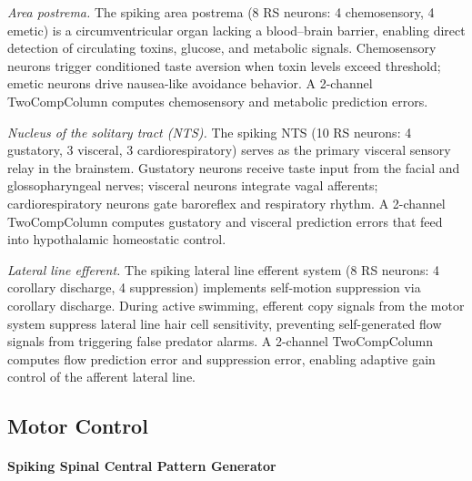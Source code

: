 \documentclass[12pt]{article}
\begin{document}
\emph{Area postrema.}
The spiking area postrema (8 RS neurons: 4 chemosensory, 4 emetic)
is a circumventricular organ lacking a blood--brain barrier, enabling
direct detection of circulating toxins, glucose, and metabolic signals.
Chemosensory neurons trigger conditioned taste aversion when toxin
levels exceed threshold; emetic neurons drive nausea-like avoidance
behavior.
A 2-channel TwoCompColumn computes chemosensory and metabolic
prediction errors.

\emph{Nucleus of the solitary tract (NTS).}
The spiking NTS (10 RS neurons: 4 gustatory, 3 visceral,
3 cardiorespiratory) serves as the primary visceral sensory relay
in the brainstem.
Gustatory neurons receive taste input from the facial and
glossopharyngeal nerves; visceral neurons integrate vagal afferents;
cardiorespiratory neurons gate baroreflex and respiratory rhythm.
A 2-channel TwoCompColumn computes gustatory and visceral prediction
errors that feed into hypothalamic homeostatic control.

\emph{Lateral line efferent.}
The spiking lateral line efferent system (8 RS neurons: 4 corollary
discharge, 4 suppression) implements self-motion suppression via
corollary discharge.
During active swimming, efferent copy signals from the motor system
suppress lateral line hair cell sensitivity, preventing self-generated
flow signals from triggering false predator alarms.
A 2-channel TwoCompColumn computes flow prediction error and
suppression error, enabling adaptive gain control of the afferent
lateral line.

\subsection{Motor Control}\label{sec:motor}

\paragraph{Spiking Spinal Central Pattern Generator}
\end{document}
